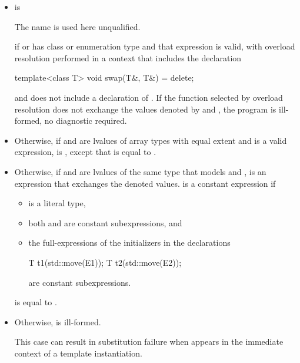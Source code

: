 \begin{itemize}
\item
   is 
\begin{footnote}
The name  is used
  here unqualified.
\end{footnote}
if  or 
  has class or enumeration type and that expression is valid, with
  overload resolution performed in a context that includes the declaration
\begin{codeblock}
template<class T>
  void swap(T&, T&) = delete;
\end{codeblock}
  and does not include a declaration of .
  If the function selected by overload resolution does not
  exchange the values denoted by
   and ,
  the program is ill-formed, no diagnostic required.

\item
  Otherwise, if  and 
  are lvalues of array types
  with equal extent and 
  is a valid expression,
   is ,
  except that
   is equal to
  .

\item
  Otherwise, if  and  are lvalues of the
  same type  that models  and
  ,
   is an expression that exchanges the denoted values.
   is a constant expression if
  \begin{itemize}
  \item {} is a literal type,
  \item both  and  are
    constant subexpressions, and
  \item the full-expressions of the initializers in the declarations
\begin{codeblock}
T t1(std::move(E1));
T t2(std::move(E2));
\end{codeblock}
are constant subexpressions.
  \end{itemize}
   is equal to
  .

\item
  Otherwise,  is ill-formed.
  \begin{note}
  This case can result in substitution failure when 
  appears in the immediate context of a template instantiation.
  \end{note}
\end{itemize}


